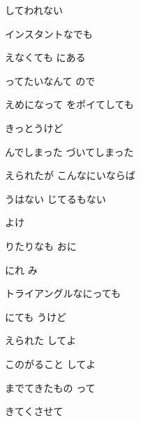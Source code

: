 \documentclass[a4paper,tate,twocolumn,12pt]{ltjtarticle}
\begin{document}
\begin{flushleft}
\begin{minipage}{\linewidth}
してわれない

インスタントなでも

えなくても にある
\end{minipage}

\vspace{2em}

\noindent\begin{minipage}{\linewidth}
ってたいなんて  ので

えめになって をポイてしても

きっとうけど

んでしまった づいてしまった

えられたが こんなにいならば

うはない じてるもない

よけ
\end{minipage}

\vspace{2em}

\noindent\begin{minipage}{\linewidth}
りたりなも おに

にれ み

トライアングルなにっても

にても うけど
\end{minipage}

\vspace{2em}

\noindent\begin{minipage}{\linewidth}
えられた してよ

このがること してよ

までてきたもの って

きてくさせて
\end{minipage}


\end{flushleft}
\end{document}
